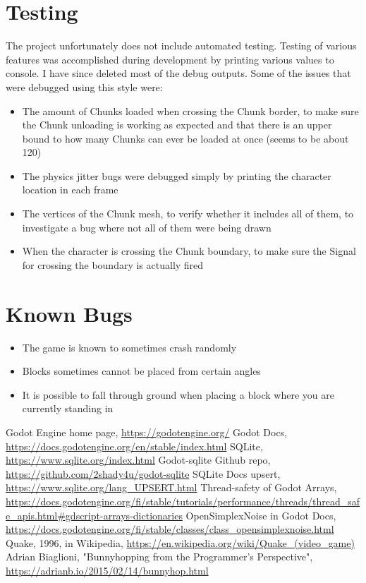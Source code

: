 \documentclass{report}
\begin{document}
\section{Testing}
The project unfortunately does not include automated testing. Testing of various features was accomplished during development by printing various values to console. I have since deleted most of the debug outputs. Some of the issues that were debugged using this style were:
\begin{itemize}
	\item The amount of Chunks loaded when crossing the Chunk border, to make sure the Chunk unloading is working as expected and that there is an upper bound to how many Chunks can ever be loaded at once (seems to be about 120)
	\item The physics jitter bugs were debugged simply by printing the character location in each frame
	\item The vertices of the Chunk mesh, to verify whether it includes all of them, to investigate a bug where not all of them were being drawn
	\item When the character is crossing the Chunk boundary, to make sure the Signal for crossing the boundary is actually fired
\end{itemize}
\section{Known Bugs}
\begin{itemize}
	\item The game is known to sometimes crash randomly
	\item Blocks sometimes cannot be placed from certain angles
	\item It is possible to fall through ground when placing a block where you are currently standing in
\end{itemize}
\begin{thebibliography}{9}
Godot Engine home page, \url{https://godotengine.org/}
Godot Docs, \url{https://docs.godotengine.org/en/stable/index.html}
SQLite, \url{https://www.sqlite.org/index.html}
Godot-sqlite Github repo, \url{https://github.com/2shady4u/godot-sqlite}
SQLite Docs upsert, \url{https://www.sqlite.org/lang_UPSERT.html}
Thread-safety of Godot Arrays, \url{https://docs.godotengine.org/fi/stable/tutorials/performance/threads/thread_safe_apis.html#gdscript-arrays-dictionaries}
OpenSimplexNoise in Godot Docs, \url{https://docs.godotengine.org/fi/stable/classes/class_opensimplexnoise.html}
Quake, 1996, in Wikipedia, \url{https://en.wikipedia.org/wiki/Quake_(video_game)}
Adrian Biaglioni, "Bunnyhopping from the Programmer's Perspective", \url{https://adrianb.io/2015/02/14/bunnyhop.html}
\end{thebibliography}
\end{document}
